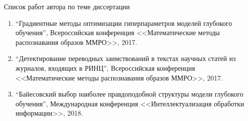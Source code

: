 \documentclass[usenames,dvipsnames,11pt,pdf,utf8,russian,aspectratio=43]{beamer}
\begin{document}
\begin{frame}{Список работ автора по теме диссертации}
\begin{enumerate}
\item ``Градиентные методы оптимизации гиперпараметров моделей глубокого обучения'', Всероссийская конференция <<Математические методы распознавания образов ММРО>>, 2017.
\item ``Детектирование переводных заимствований в текстах научных статей из журналов, входящих в РИНЦ'', Всероссийская конференция <<Математические методы распознавания образов ММРО>>, 2017.
\item ``Байесовский выбор наиболее правдоподобной структуры модели глубокого обучения'', Международная конференция <<Интеллектуализация обработки информации>>, 2018.
\end{enumerate}
\end{frame}
\end{document}

